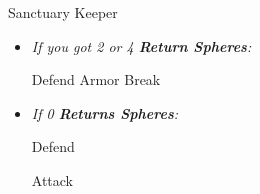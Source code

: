 \begin{battle}[40000]{Sanctuary Keeper}
    \begin{itemize}
        \item \textit{If you got 2 or 4 \textbf{Return Spheres}:}
        \begin{itemize}
            \yunaf Defend
            \tidusf Armor Break
        \end{itemize}
        \item \textit{If 0 \textbf{Returns Spheres}:}
        \begin{itemize}
            \tidusf Defend
        \end{itemize}
        \summon{\bahamut}
        \bahamutf Attack
    \end{itemize}
\end{battle}

